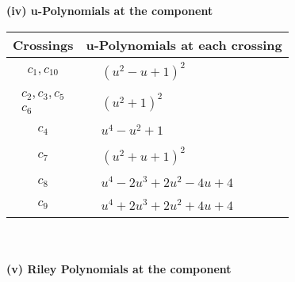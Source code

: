 \documentclass[1p]{elsarticle_modified}
\theoremstyle{definition}
\begin{document}
\newpage\renewcommand{\arraystretch}{1}
\flushleft \textbf{(iv) u-Polynomials at the component}\newline \\
\begin{tabular}{m{50pt}|m{274pt}}
Crossings & \hspace{64pt}u-Polynomials at each crossing \\
\hline $$\begin{aligned}c_{1},c_{10}\end{aligned}$$&$\begin{aligned}
&(u^2- u+1)^2
\end{aligned}$\\
\hline $$\begin{aligned}c_{2},c_{3},c_{5}\\c_{6}\end{aligned}$$&$\begin{aligned}
&(u^2+1)^2
\end{aligned}$\\
\hline $$\begin{aligned}c_{4}\end{aligned}$$&$\begin{aligned}
&u^4- u^2+1
\end{aligned}$\\
\hline $$\begin{aligned}c_{7}\end{aligned}$$&$\begin{aligned}
&(u^2+u+1)^2
\end{aligned}$\\
\hline $$\begin{aligned}c_{8}\end{aligned}$$&$\begin{aligned}
&u^4-2 u^3+2 u^2-4 u+4
\end{aligned}$\\
\hline $$\begin{aligned}c_{9}\end{aligned}$$&$\begin{aligned}
&u^4+2 u^3+2 u^2+4 u+4
\end{aligned}$\\
\hline
\end{tabular}\\~\\
\newpage\renewcommand{\arraystretch}{1}
\flushleft \textbf{(v) Riley Polynomials at the component}\newline \\
\end{document}
